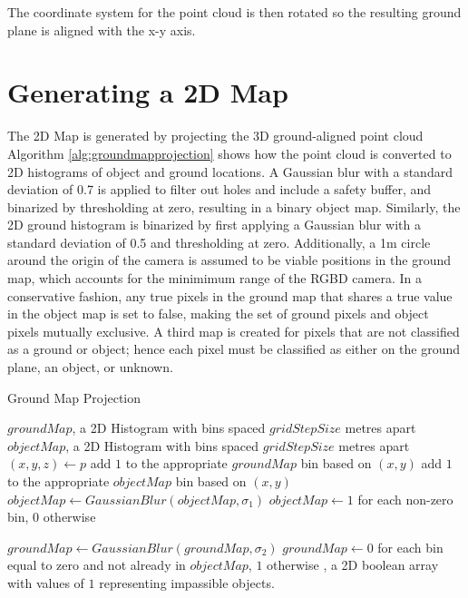 The coordinate system for the point cloud is then rotated so the resulting
ground plane is aligned with the x-y axis.

\section{Generating a 2D Map}
The 2D Map is generated by projecting the 3D ground-aligned point cloud 
Algorithm \autoref{alg:groundmapprojection} shows how the point cloud is
converted to 2D histograms of object and ground locations. A Gaussian blur with
a standard deviation of 0.7 is applied to filter out holes and include a safety
buffer, and binarized by thresholding at zero, resulting in a binary object map.
Similarly, the 2D ground histogram is binarized by first applying a Gaussian
blur with a standard deviation of 0.5 and thresholding at zero. Additionally, a
1m circle around the origin of the camera is assumed to be viable positions in
the ground map, which accounts for the minimimum range of the RGBD camera. In a
conservative fashion, any true pixels in the ground map that shares a true value
in the object map is set to false, making the set of ground pixels and object
pixels mutually exclusive. A third map is created for pixels that are not
classified as a ground or object; hence each pixel must be classified as either
on the ground plane, an object, or unknown.

\begin{algorithm}
\caption{Ground Map Projection}
\label{alg:groundmapprojection}
\begin{algorithmic}[1]
\Statex
{}
    \State $groundMap$, a 2D Histogram with bins spaced $gridStepSize$ metres apart
    \State $objectMap$, a 2D Histogram with bins spaced $gridStepSize$ metres apart
        \State $(x,y,z) \gets p$
            \State add $1$ to the appropriate $groundMap$ bin based on $(x,y)$
        \Else
            \State add $1$ to the appropriate $objectMap$ bin based on $(x,y)$
        \EndIf
    \EndFor
    \State $objectMap \gets GaussianBlur(objectMap, \sigma_1)$
    \State $objectMap \gets 1$ for each non-zero bin, $0$ otherwise

    \State $groundMap \gets GaussianBlur(groundMap, \sigma_2)$
    \State $groundMap \gets 0$ for each bin equal to zero and not already in $objectMap$, $1$ otherwise
\EndFunction
\Statex
{}, a 2D boolean array with values of $1$ representing
impassible objects.
\end{algorithmic}
\end{algorithm}

